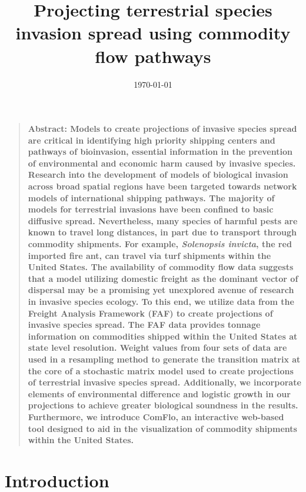 \documentclass[12pt]{article}
\title{Projecting terrestrial species invasion spread using commodity flow pathways}
\author
{Ashish Gauli,$^{1,2}$ Nathan Wikle,$^{1,3}$ Ryan Yan,$^{1,4}$\\ 
Dr. Louis Gross,$^{1,5}$ Dr. Daniel Simberloff,$^{5}$ Angela Chuang,$^{5}$ Cedric Landerer$^{5}$\\
\\
\normalsize{$^{1}$National Institute for Mathematical and Biological Synthesis (NIMBioS)}\\
\normalsize{$^{2}$Computer Science, Fisk University}\\
\normalsize{$^{3}$Mathematics, Truman State University}\\
\normalsize{$^{4}$Mathematical Biology, College of William and Mary}\\
\normalsize{$^{5}$Ecology and Evolutionary Biology, University of Tennessee}\\
\\
}
\date{\today}
\newenvironment{sciabstract}{%
\begin{quote} \bf}
{\end{quote}}
\begin{document}
 


\baselineskip24pt


\maketitle 


 \begin{sciabstract}
Abstract: Models to create projections of invasive species spread are critical in identifying high priority shipping centers and pathways of bioinvasion, essential information in the prevention of environmental and economic harm caused by invasive species. Research into the development of models of biological invasion across broad spatial regions have been targeted towards network models of international shipping pathways. The majority of models for terrestrial invasions have been confined to basic diffusive spread. Nevertheless, many species of harmful pests are known to travel long distances, in part due to transport through commodity shipments. For example, \textit{Solenopsis invicta}, the red imported fire ant, can travel via turf shipments within the United States. The availability of commodity flow data suggests that a model utilizing domestic freight as the dominant vector of dispersal may be a promising yet unexplored avenue of research in invasive species ecology. To this end, we utilize data from the Freight Analysis Framework (FAF) to create projections of invasive species spread. The FAF data provides tonnage information on commodities shipped within the United States at state level resolution. Weight values from four sets of data are used in a resampling method to generate the transition matrix at the core of a stochastic matrix model used to create projections of terrestrial invasive species spread. Additionally, we incorporate elements of environmental difference and logistic growth in our projections to achieve greater biological soundness in the results. Furthermore, we introduce ComFlo, an interactive web-based tool designed to aid in the visualization of commodity shipments within the United States.
\end{sciabstract}



\section*{Introduction}
\end{document}
